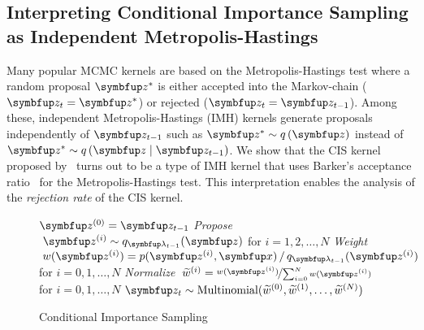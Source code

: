 \subsection{Interpreting Conditional Importance Sampling as Independent Metropolis-Hastings}\label{section:cis_imh}
Many popular MCMC kernels are based on the Metropolis-Hastings test where a random proposal \(\vz^*\) is either accepted into the Markov-chain (\(\vz_{t} = \vz^*\)) or rejected (\(\vz_t = \vz_{t-1}\)).
Among these, independent Metropolis-Hastings (IMH) kernels generate proposals independently of \(\vz_{t-1}\) such as \(\vz^* \sim q\,(\vz)\) instead of \(\vz^* \sim q\,(\vz\mid\vz_{t-1})\).%
We show that the CIS kernel proposed by~\citet{NEURIPS2020_b2070693} turns out to be a type of IMH kernel that uses Barker's acceptance ratio~\citep{barker_monte_1965} for the Metropolis-Hastings test.
This interpretation enables the analysis of the \textit{rejection rate} of the CIS kernel.

\begin{figure}[H]
  \vspace{-0.1in}
  \small
  \begin{algorithm2e}[H]
    \DontPrintSemicolon
    \SetAlgoLined
    \(\vz^{(0)} = \vz_{t-1}\) \;
    \textit{Propose} \(\;\vz^{(i)} \sim q_{\vlambda_{t-1}}(\vz)\) for \(i = 1, 2,\ldots, N\) \;
    \textit{Weight} \(\;w(\vz^{(i)}) = p(\vz^{(i)},\vx) \,/\, q_{\vlambda_{t-1}}(\vz^{(i)}) \) for \(i = 0, 1,\ldots, N\)\;
    \textit{Normalize} \(\;\widetilde{w}^{(i)} = \nicefrac{w(\vz^{(i)})}{ \sum^{N}_{i=0} w(\vz^{(i)}) }\) for \(i = 0, 1,\ldots, N\)\;
    \(\vz_{t} \sim \mathrm{Multinomial}(\widetilde{w}^{(0)}, \widetilde{w}^{(1)}, \ldots, \widetilde{w}^{(N)}) \)\;
    \caption{Conditional Importance Sampling}\label{alg:cis}
  \end{algorithm2e}
  \vspace{-0.2in}
\end{figure}
%
\vspace{-0.1in}
